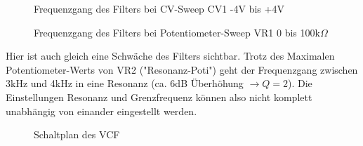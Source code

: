 \begin{figure}[h]
	\centering
	\setlength{\fboxsep}{1pt} %
	\setlength{\fboxrule}{1pt} %
	\caption{Frequenzgang des Filters bei CV-Sweep CV1 -4V bis +4V}
	\label{fig:toleranzschema}
\end{figure}

\begin{figure}[h]
	\centering
	\setlength{\fboxsep}{1pt} %
	\setlength{\fboxrule}{1pt} %
	\caption{Frequenzgang des Filters bei Potentiometer-Sweep VR1 0 bis 100k$\Omega$}
	\label{fig:toleranzschema}
\end{figure}

Hier ist auch gleich eine Schwäche des Filters sichtbar. Trotz des Maximalen Potentiometer-Werts von VR2 ("Resonanz-Poti") geht der Frequenzgang
zwischen 3kHz und 4kHz in eine Resonanz (ca. 6dB Überhöhung $\rightarrow Q = 2$). Die Einstellungen Resonanz und Grenzfrequenz können also nicht komplett unabhängig von einander eingestellt werden.

\begin{figure}[h]
	\centering
	\setlength{\fboxsep}{1pt} %
	\setlength{\fboxrule}{1pt} %
	\caption{Schaltplan des VCF}
\end{figure}
\newpage
